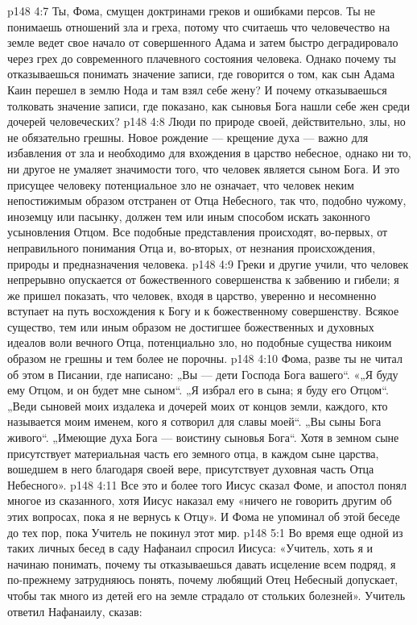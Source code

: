 \vs p148 4:7 Ты, Фома, смущен доктринами греков и ошибками персов. Ты не понимаешь отношений зла и греха, потому что считаешь что человечество на земле ведет свое начало от совершенного Адама и затем быстро деградировало через грех до современного плачевного состояния человека. Однако почему ты отказываешься понимать значение записи, где говорится о том, как сын Адама Каин перешел в землю Нода и там взял себе жену? И почему отказываешься толковать значение записи, где показано, как сыновья Бога нашли себе жен среди дочерей человеческих?
\vs p148 4:8 Люди по природе своей, действительно, злы, но не обязательно грешны. Новое рождение --- крещение духа --- важно для избавления от зла и необходимо для вхождения в царство небесное, однако ни то, ни другое не умаляет значимости того, что человек является сыном Бога. И это присущее человеку потенциальное зло не означает, что человек неким непостижимым образом отстранен от Отца Небесного, так что, подобно чужому, иноземцу или пасынку, должен тем или иным способом искать законного усыновления Отцом. Все подобные представления происходят, во\hyp{}первых, от неправильного понимания Отца и, во\hyp{}вторых, от незнания происхождения, природы и предназначения человека.
\vs p148 4:9 Греки и другие учили, что человек непрерывно опускается от божественного совершенства к забвению и гибели; я же пришел показать, что человек, входя в царство, уверенно и несомненно вступает на путь восхождения к Богу и к божественному совершенству. Всякое существо, тем или иным образом не достигшее божественных и духовных идеалов воли вечного Отца, потенциально зло, но подобные существа никоим образом не грешны и тем более не порочны.
\vs p148 4:10 Фома, разве ты не читал об этом в Писании, где написано: „Вы --- дети Господа Бога вашего“. «„Я буду ему Отцом, и он будет мне сыном“. „Я избрал его в сына; я буду его Отцом“. „Веди сыновей моих издалека и дочерей моих от концов земли, каждого, кто называется моим именем, кого я сотворил для славы моей“. „Вы сыны Бога живого“. „Имеющие духа Бога --- воистину сыновья Бога“. Хотя в земном сыне присутствует материальная часть его земного отца, в каждом сыне царства, вошедшем в него благодаря своей вере, присутствует духовная часть Отца Небесного».
\vs p148 4:11 \pc Все это и более того Иисус сказал Фоме, и апостол понял многое из сказанного, хотя Иисус наказал ему «ничего не говорить другим об этих вопросах, пока я не вернусь к Отцу». И Фома не упоминал об этой беседе до тех пор, пока Учитель не покинул этот мир.
\vs p148 5:1 Во время еще одной из таких личных бесед в саду Нафанаил спросил Иисуса: «Учитель, хоть я и начинаю понимать, почему ты отказываешься давать исцеление всем подряд, я по\hyp{}прежнему затрудняюсь понять, почему любящий Отец Небесный допускает, чтобы так много из детей его на земле страдало от стольких болезней». Учитель ответил Нафанаилу, сказав:
